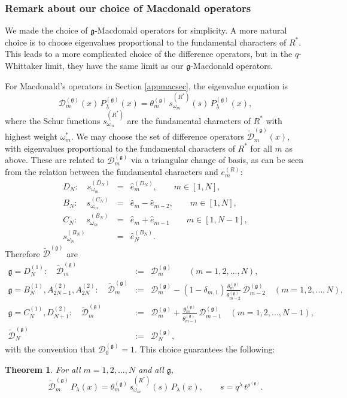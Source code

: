 \documentclass[12pt]{amsart}
\newtheorem{thm}{Theorem}[section]
\newcommand{\g}{{\mathfrak{g}}}
\numberwithin{equation}{section}
\begin{document}
%
%
%
%
%
%
%
%
%


%
%

\subsubsection{Remark about our choice of Macdonald operators}\label{aboutsec}
We made the choice of $\g$-Macdonald operators for simplicity. A more natural choice is to choose eigenvalues proportional to the fundamental characters of $R^*$. This leads to a more complicated choice of the difference operators, but in the $q$-Whittaker limit, they have the same limit as our $\g$-Macdonald operators.

For Macdonald's operators in Section \ref{appmacsec}, 
the eigenvalue equation is
$$ {\mathcal D}_m^{(\g)}(x)\, P_\lambda^{(\g)}(x)= \theta_m^{(\g)}\,s_{\omega_m}^{(R^*)}(s)\, P_\lambda^{(\g)}(x) ,$$
where the Schur functions $s_{\omega_m}^{(R^*)}$ are the fundamental characters of $R^*$ with highest weight $\omega_m^*$.
%
%
We may choose the set of difference operators $\tilde{\mathcal D}_m^{(\g)}(x)$, with
 eigenvalues proportional to the fundamental characters of $R^*$ for all $m$ as above.
These are related to ${\mathcal D}_m^{(\g)}$ via a triangular change of basis, as can be seen from the relation between the fundamental characters and $e_m^{(R)}$:
%
%
%
\begin{eqnarray*}
D_N: \quad s_{\omega_m}^{(D_N)}&=&\hat{e}_m^{(D_N)} ,\qquad m\in[1,N],\\
B_N: \quad 
s_{\omega_m}^{(C_N)}&=&\hat{e}_m-\hat{e}_{m-2} , \qquad m\in[1,N],\\
C_N: \quad 
s_{\omega_m}^{(B_N)}&=&\hat{e}_m+\hat{e}_{m-1}  \qquad m\in[1,N-1],\\
s_{\omega_N}^{(B_N)}&=&\hat{e}_N^{(B_N)}.
\end{eqnarray*}
%
Therefore
$\tilde{\mathcal D}^{(\g)}$ are
\begin{eqnarray}
\g=D_N^{(1)}: \quad \tilde{\mathcal D}^{(\g)}_m&:=& {\mathcal D}^{(\g)}_m \qquad (m=1,2,...,N),\nonumber \\
\g=B_N^{(1)},A_{2N-1}^{(2)},A_{2N}^{(2)}: \quad \tilde{\mathcal D}^{(\g)}_m&:=&{\mathcal D}^{(\g)}_m
-(1-\delta_{m,1})\frac{\theta_m^{(\g)}}{\theta_{m-2}^{(\g)}}\, {\mathcal D}^{(\g)}_{m-2} \quad (m=1,2,...,N),\nonumber \\
\g=C_N^{(1)},D_{N+1}^{(2)}: \quad \tilde{\mathcal D}^{(\g)}_m&:=&{\mathcal D}^{(\g)}_m
+\frac{\theta_m^{(\g)}}{\theta_{m-1}^{(\g)}}\, {\mathcal D}^{(\g)}_{m-1}\quad (m=1,2,...,N-1),\nonumber\\
\tilde{\mathcal D}^{(\g)}_N&:=&{\mathcal D}^{(\g)}_N ,\label{tildeDdef}
\end{eqnarray}
with the convention that ${\mathcal D}^{(\g)}_0=1$.
This choice guarantees the following:
%
\begin{thm}
For all $m=1,2,...,N$ and all $\g$,
\begin{equation}\label{spectilde}
\tilde{\mathcal D}^{(\g)}_m\, P_\lambda(x)=\theta_m^{(\g)}\, s_{\omega_m}^{(R^*)}(s)\, P_\lambda(x), \qquad s=q^\lambda \,t^{\rho^{(\g)}}.
\end{equation}
\end{thm}
\end{document}
